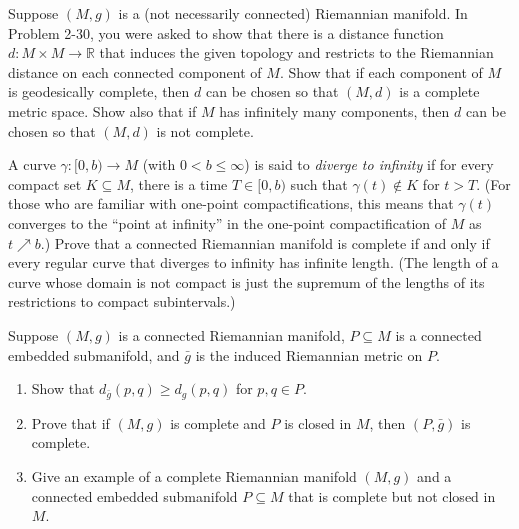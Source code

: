 \begin{exercise}
\label{prob:distance-complete-metric}

Suppose $(M, g)$ is a (not necessarily connected) Riemannian manifold. In Problem 2-30, you were asked to show that there is a distance function $d : M \times M \to \mathbb{R}$ that induces the given topology and restricts to the Riemannian distance on each connected component of $M$. Show that if each component of $M$ is geodesically complete, then $d$ can be chosen so that $(M, d)$ is a complete metric space. Show also that if $M$ has infinitely many components, then $d$ can be chosen so that $(M, d)$ is not complete.
\end{exercise}

\begin{exercise}
\label{prob:completeness-divergence}

A curve $\gamma : [0, b) \to M$ (with $0 < b \leq \infty$) is said to \emph{diverge to infinity} if for every compact set $K \subseteq M$, there is a time $T \in [0, b)$ such that $\gamma(t) \notin K$ for $t > T$. (For those who are familiar with one-point compactifications, this means that $\gamma(t)$ converges to the ``point at infinity'' in the one-point compactification of $M$ as $t \nearrow b$.) Prove that a connected Riemannian manifold is complete if and only if every regular curve that diverges to infinity has infinite length. (The length of a curve whose domain is not compact is just the supremum of the lengths of its restrictions to compact subintervals.)
\end{exercise}

\begin{exercise}
\label{prob:submanifold-distance-inequality}

Suppose $(M, g)$ is a connected Riemannian manifold, $P \subseteq M$ is a connected embedded submanifold, and $\bar{g}$ is the induced Riemannian metric on $P$.
\begin{enumerate}
\item[(a)] Show that $d_{\bar{g}}(p, q) \geq d_g(p, q)$ for $p, q \in P$.
\item[(b)] Prove that if $(M, g)$ is complete and $P$ is closed in $M$, then $(P, \bar{g})$ is complete.
\item[(c)] Give an example of a complete Riemannian manifold $(M, g)$ and a connected embedded submanifold $P \subseteq M$ that is complete but not closed in $M$.
\end{enumerate}
\end{exercise}

